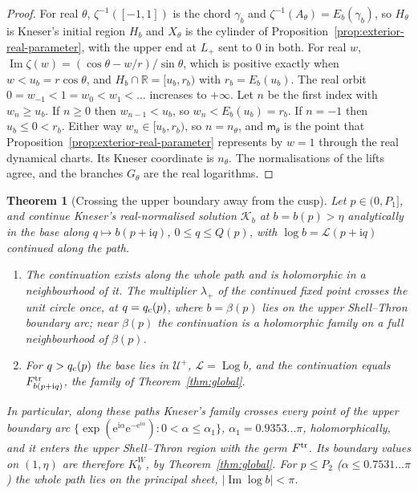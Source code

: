 \documentclass[11pt]{amsart}
\newtheorem{theorem}{Theorem}[section]
\theoremstyle{definition}
\newcommand{\Kk}{K}
\newcommand{\eee}{\mathrm{e}}
\newcommand{\ii}{\mathrm{i}}
\begin{document}
\begin{proof}
For real $\theta$, $\zeta^{-1}([-1,1])$ is the chord $\gamma_b$ and $\zeta^{-1}(A_\theta)=E_b(\gamma_b)$, so $H_\theta$ is
Kneser's initial region $H_b$ and $X_\theta$ is the cylinder of
Proposition~\ref{prop:exterior-real-parameter}, with the upper end at $L_+$ sent to $0$
in both.  For real $w$, $\operatorname{Im}\zeta(w)=(\cos\theta-w/r)/\sin\theta$, which is positive exactly when
$w<u_b=r\cos\theta$, and $H_b\cap\mathbb R=[u_b,r_b)$ with $r_b=E_b(u_b)$.  The real orbit
$0=w_{-1}<1=w_0<w_1<\dots$ increases to $+\infty$.  Let $n$ be the first index with $w_n\ge u_b$.  If
$n\ge0$ then $w_{n-1}<u_b$, so $w_n<E_b(u_b)=r_b$.  If $n=-1$ then $u_b\le0<r_b$.  Either way
$w_n\in[u_b,r_b)$, so $n=n_\theta$, and $\mathsf m_\theta$ is the point that
Proposition~\ref{prop:exterior-real-parameter} represents by $w=1$ through the real
dynamical charts.  Its Kneser coordinate is $n_\theta$.  The normalisations of the lifts
agree, and the branches $G_\theta$ are the real logarithms.
\end{proof}

\begin{theorem}[Crossing the upper boundary away from the cusp]\label{thm:far}
Let $p\in(0,P_1]$, and continue Kneser's real-normalised solution $\mathcal K_b$ at
$b=b(p)>\eta$ analytically in the base along $q\mapsto b(p+\ii q)$, $0\le q\le Q(p)$, with
$\log b=\mathcal L(p+\ii q)$ continued along the path.
\begin{enumerate}
\item The continuation exists along the whole path and is holomorphic in a
  neighbourhood of it.  The multiplier $\lambda_+$ of the continued fixed point crosses
  the unit circle once, at $q=q_{\rm c}(p)$, where $b=\beta(p)$ lies on the upper
  Shell--Thron boundary arc; near $\beta(p)$ the continuation is a holomorphic family
  on a full neighbourhood of $\beta(p)$.
\item For $q>q_{\rm c}(p)$ the base lies in $\mathcal U^+$, $\mathcal L=\operatorname{Log}b$, and the continuation
  equals $F^{\rm tr}_{b(p+\ii q)}$, the family of Theorem~\ref{thm:global}.
\end{enumerate}
In particular, along these paths Kneser's family crosses every point of the upper
boundary arc $\{\exp(\eee^{\ii\alpha}\eee^{-\eee^{\ii\alpha}}):0<\alpha\le\alpha_1\}$, $\alpha_1=0.9353\ldots\pi$,
holomorphically, and it enters the upper Shell--Thron region with the germ $F^{\rm tr}$.
Its boundary values on $(1,\eta)$ are therefore $\Kk^W_b$, by Theorem~\ref{thm:global}.
For $p\le P_2$ ($\alpha\le0.7531\ldots\pi$) the whole path lies on the principal sheet,
$|\operatorname{Im}\log b|<\pi$.
\end{theorem}
\end{document}
